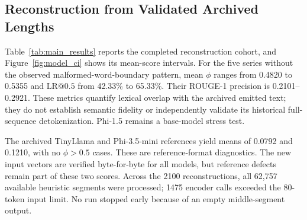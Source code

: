 \documentclass[electronics,article,submit,pdftex,moreauthors]{Definitions/mdpi}
\begin{document}
\subsection{Reconstruction from Validated Archived Lengths}
Table~\ref{tab:main_results} reports the completed reconstruction cohort, and Figure~\ref{fig:model_ci} shows its mean-score intervals. For the five series without the observed malformed-word-boundary pattern, mean $\phi$ ranges from 0.4820 to 0.5355 and $\mathrm{LR}@0.5$ from 42.33\% to 65.33\%. Their ROUGE-1 precision is 0.2101--0.2921. These metrics quantify lexical overlap with the archived emitted text; they do not establish semantic fidelity or independently validate its historical full-sequence detokenization. Phi-1.5 remains a base-model stress test.

The archived TinyLlama and Phi-3.5-mini references yield means of 0.0792 and 0.1210, with no $\phi>0.5$ cases. These are reference-format diagnostics. The new input vectors are verified byte-for-byte for all models, but reference defects remain part of these two scores. Across the 2100 reconstructions, all 62,757 available heuristic segments were processed; 1475 encoder calls exceeded the 80-token input limit. No run stopped early because of an empty middle-segment output.

\begin{table}[ht]
\centering
\caption{Complete reconstructions from validated archived payload lengths ($N=300$ per model; 512-token victim budget; all available heuristic segments; three samples per segment; 80-token T5 input and output limits). Full archived emitted responses are the references. The final two rows are reference-format diagnostics; input provenance is verified for every row.}
\label{tab:main_results}
\end{table}
\end{document}
